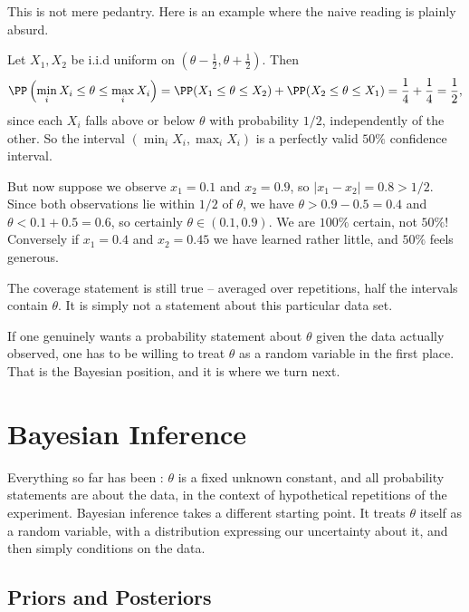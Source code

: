 This is not mere pedantry. Here is an example where the naive reading is plainly absurd.

\begin{example}
  Let $X_1, X_2$ be i.i.d uniform on $\left(\theta - \frac{1}{2}, \theta + \frac{1}{2}\right)$. Then
  $$
  \PP\left(\min_i X_i \leq \theta \leq \max_i X_i\right) = \PP(X_1 \leq \theta \leq X_2) + \PP(X_2 \leq \theta \leq X_1) = \frac{1}{4} + \frac{1}{4} = \frac{1}{2},
  $$
  since each $X_i$ falls above or below $\theta$ with probability $1/2$, independently of the other. So the interval $\left(\min_i X_i, \max_i X_i\right)$ is a perfectly valid $50\%$ confidence interval.

  But now suppose we observe $x_1 = 0.1$ and $x_2 = 0.9$, so $|x_1 - x_2| = 0.8 > 1/2$. Since both observations lie within $1/2$ of $\theta$, we have $\theta > 0.9 - 0.5 = 0.4$ and $\theta < 0.1 + 0.5 = 0.6$, so certainly $\theta \in (0.1, 0.9)$. We are $100\%$ certain, not $50\%$! Conversely if $x_1 = 0.4$ and $x_2 = 0.45$ we have learned rather little, and $50\%$ feels generous.

  The coverage statement is still true -- averaged over repetitions, half the intervals contain $\theta$. It is simply not a statement about this particular data set.
\end{example}

If one genuinely wants a probability statement about $\theta$ given the data actually observed, one has to be willing to treat $\theta$ as a random variable in the first place. That is the Bayesian position, and it is where we turn next.


\section{Bayesian Inference}

Everything so far has been : $\theta$ is a fixed unknown constant, and all probability statements are about the data, in the context of hypothetical repetitions of the experiment. Bayesian inference takes a different starting point. It treats $\theta$ itself as a random variable, with a distribution expressing our uncertainty about it, and then simply conditions on the data.

\subsection{Priors and Posteriors}

